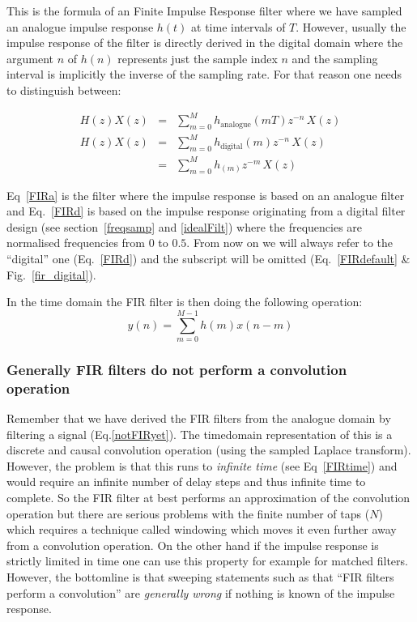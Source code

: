 \documentclass[12pt,a4paper]{article}
\begin{document}
This is the formula of an Finite Impulse Response filter where we have
sampled an analogue impulse response $h(t)$ at time intervals of $T$.
However, usually the impulse response of the filter is directly derived
in the digital domain where the argument $n$ of $h(n)$ represents just the sample
index $n$ and the sampling interval is implicitly the inverse of the sampling
rate. For that reason one needs to distinguish between:

\begin{eqnarray}
H(z)X(z) & = & \sum_{m=0}^M h_\textrm{analogue}(mT) z^{-n} \, X(z) \label{FIRa} \\
H(z)X(z) & = & \sum_{m=0}^M h_\textrm{digital}(m) z^{-n} \, X(z) \label{FIRd} \\
         & = & \sum_{m=0}^M h_(m) z^{-m} \, X(z) \label{FIRdefault}
\end{eqnarray}

Eq~\ref{FIRa} is the filter where the impulse response is based on an analogue
filter and Eq.~\ref{FIRd} is based on the impulse response originating from a digital filter
design (see section~\ref{freqsamp} and \ref{idealFilt}) where the frequencies
are normalised frequencies from $0$ to $0.5$. From now on we will
always refer to the ``digital'' one (Eq.~\ref{FIRd}) and the subscript will be
omitted (Eq.~\ref{FIRdefault} \& Fig.~\ref{fir_digital}).

In the time domain the FIR filter is then doing the following operation:
\begin{equation}
  y(n) = \sum_{m=0}^{M-1} h(m) x(n-m) \label{FIRtime}
\end{equation}

\subsubsection{Generally FIR filters do not perform a convolution operation}

Remember that we have derived the FIR filters from the analogue domain
by filtering a signal (Eq.\ref{notFIRyet}). The timedomain
representation of this is a discrete and causal convolution operation
(using the sampled Laplace transform). However, the problem is that
this runs to \textsl{infinite time} (see Eq~\ref{FIRtime}) and would
require an infinite number of delay steps and thus infinite time to
complete. So the FIR filter at best performs an approximation of the
convolution operation but there are serious problems with the finite
number of taps ($N$) which requires a technique called windowing which
moves it even further away from a convolution operation. On the other
hand if the impulse response is strictly limited in time one can use
this property for example for matched filters. However, the bottomline
is that sweeping statements such as that ``FIR filters perform a
convolution'' are \textsl{generally wrong} if nothing is known of the
impulse response.
\end{document}
